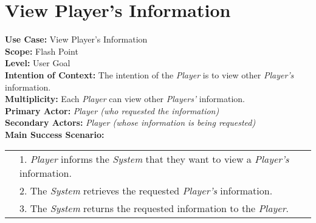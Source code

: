 \documentclass{article}
\begin{document}
	\section*{View Player's Information}
	\textbf{Use Case:} View Player's Information\\
	\textbf{Scope:} Flash Point\\
	\textbf{Level:} User Goal\\
	\textbf{Intention of Context:} The intention of the \textit{Player} is to view other \textit{Player's} information.\\
	\textbf{Multiplicity: }Each \textit{Player} can view other \textit{Players'} information.\\
	\textbf{Primary Actor:} \textit{Player (who requested the information)}\\
	\textbf{Secondary Actors:} \textit{Player (whose information is being requested)}\\
	\textbf{Main Success Scenario:}\\
	\begin{tabular}{l l}
		&1. \textit{Player} informs the \textit{System} that they want to view a \textit{Player's} information.\\
		&2. The \textit{System} retrieves the requested \textit{Player's} information.\\
		&3. The \textit{System} returns the requested information to the \textit{Player}.
	\end{tabular}
\end{document}
